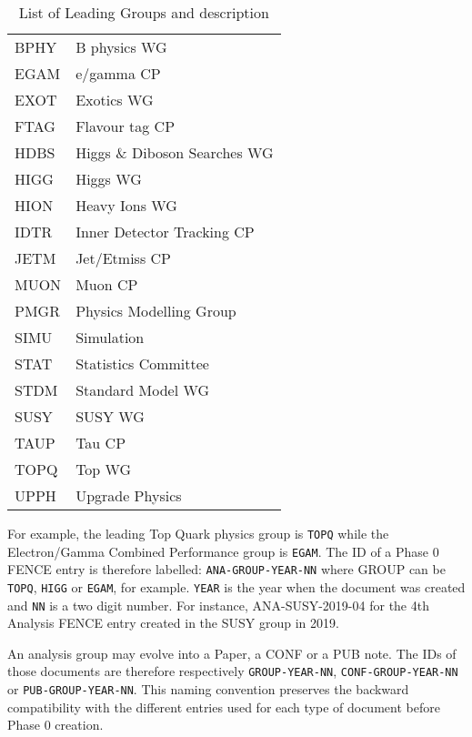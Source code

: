 \begin{table}[]
\centering
\begin{tabular}{ll}
BPHY & B physics WG                 \\
EGAM & e/gamma CP                   \\
EXOT & Exotics WG                   \\
FTAG & Flavour tag CP               \\
HDBS & Higgs \& Diboson Searches WG \\
HIGG & Higgs WG                     \\
HION & Heavy Ions WG                \\
IDTR & Inner Detector Tracking CP   \\
JETM & Jet/Etmiss CP                \\
MUON & Muon CP                      \\
PMGR & Physics Modelling Group      \\
SIMU & Simulation                   \\
STAT & Statistics Committee         \\
STDM & Standard Model WG            \\
SUSY & SUSY WG                      \\
TAUP & Tau CP                       \\
TOPQ & Top WG                       \\
UPPH & Upgrade Physics             
\end{tabular}
\caption{List of Leading Groups and description }
\label{tab:my-table}
\end{table}


For example, the leading Top Quark physics group is \texttt{TOPQ} while the Electron/Gamma Combined Performance group is \texttt{EGAM}.
The ID of a Phase 0 FENCE entry is therefore labelled: \texttt{ANA-GROUP-YEAR-NN} where GROUP can be \texttt{TOPQ}, \texttt{HIGG} or \texttt{EGAM}, for example.
\texttt{YEAR} is the year when the document was created and \texttt{NN} is a two digit number.
For instance, ANA-SUSY-2019-04 for the 4th Analysis FENCE entry created in the SUSY group in 2019.

An analysis group may evolve into a Paper, a CONF or a PUB note. The IDs of those documents are therefore respectively \texttt{GROUP-YEAR-NN}, \texttt{CONF-GROUP-YEAR-NN} or \texttt{PUB-GROUP-YEAR-NN}.
This naming convention preserves the backward compatibility with the different entries used for each type of document before Phase 0 creation.

